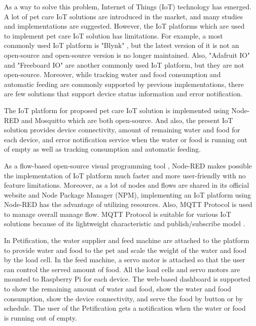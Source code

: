 \documentclass[conference]{IEEEtran}
\begin{document}
As a way to solve this problem, Internet of Things (IoT) technology has emerged. A lot of pet care IoT solutions are introduced in the market, and many studies and implementations are suggested.
However, the IoT platforms which are used to implement pet care IoT solution has limitations. For example, a most commonly used IoT platform is "Blynk" \cite{b2, b3, b4, b5}, but the latest version of it is not an open-source and open-source version is no longer maintained. Also, "Adafruit IO" \cite{b6} and "Freeboard IO" \cite{b7} are another commonly used IoT platform, but they are not open-source.
Moreover, while tracking water and food consumption and automatic feeding are commonly supported by previous implementations, there are few solutions that support device status information and error notification.

The IoT platform for proposed pet care IoT solution is implemented using Node-RED and Mosquitto which are both open-source. And also, the present IoT solution provides device connectivity, amount of remaining water and food for each device, and error notification service when the water or food is running out of empty as well as tracking consumption and automatic feeding.

As a flow-based open-source visual programming tool \cite{b8}, Node-RED makes possible the implementation of IoT platform much faster and more user-friendly with no feature limitations. Moreover, as a lot of nodes and flows are shared in its official website and Node Package Manager (NPM), implementing an IoT platform using Node-RED has the advantage of utilizing resources. Also, MQTT Protocol is used to manage overall manage flow. MQTT Protocol is suitable for various IoT solutions because of its lightweight characteristic and publish/subscribe model \cite{b9}.

In Petification, the water supplier and feed machine are attached to the platform to provide water and food to the pet and scale the weight of the water and food by the load cell. In the feed machine, a servo motor is attached so that the user can control the served amount of food. All the load cells and servo motors are mounted to Raspberry Pi for each device.
The web-based dashboard is supported to show the remaining amount of water and food, show the water and food consumption, show the device connectivity, and serve the food by button or by schedule. The user of the Petification gets a notification when the water or food is running out of empty.
\end{document}
